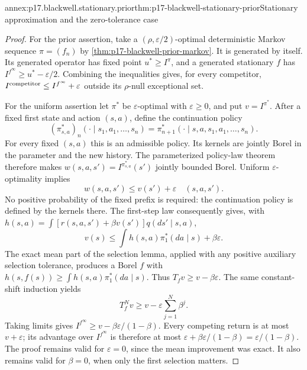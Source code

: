 \begin{annexitem}{annex:p17.blackwell.stationary.prior}{thm:p17-blackwell-stationary-prior}{Stationary approximation and the zero-tolerance case}
\begin{proof}
For the prior assertion, take a
\((\rho,\varepsilon/2)\)-optimal deterministic Markov
sequence \(\pi=(f_n)\) by
\cref{thm:p17-blackwell-prior-markov}.
It is generated by itself. Its generated operator has
fixed point \(u^*\geq I^\pi\), and a generated stationary
\(f\) has \(I^{f^\infty}\geq u^*-\varepsilon/2\).
Combining the inequalities gives, for every competitor,
\(I^{\rm competitor}\leq I^{f^\infty}+\varepsilon\)
outside its \(\rho\)-null exceptional set.

For the uniform assertion let \(\pi^*\) be
\(\varepsilon\)-optimal with \(\varepsilon\geq0\), and put
\(v=I^{\pi^*}\). After a fixed first state and action
\((s,a)\), define the continuation policy
\[
 (\pi^*_{s,a})_n(\cdot\mid s_1,a_1,\ldots,s_n)
   =\pi^*_{n+1}(\cdot\mid s,a,s_1,a_1,\ldots,s_n).
\]
For every fixed \((s,a)\) this is an admissible policy.
Its kernels are jointly Borel in the parameter and the
new history. The parameterized policy-law theorem therefore
makes \(w(s,a,s')=I^{\pi^*_{s,a}}(s')\) jointly bounded
Borel. Uniform \(\varepsilon\)-optimality implies
\[
                     w(s,a,s')\leq v(s')+\varepsilon
                                     \quad(s,a,s').
\]
No positive probability of the fixed prefix is required:
the continuation policy is defined by the kernels there.
The first-step law consequently gives, with
\(h(s,a)=\int[r(s,a,s')+\beta v(s')]q(ds'\mid s,a)\),
\[
            v(s)\leq\int h(s,a)\pi^*_1(da\mid s)
                                               +\beta\varepsilon.
\]
The exact mean part of the selection lemma, applied with
any positive auxiliary selection tolerance, produces a
Borel \(f\) with \(h(s,f(s))\geq\int h(s,a)\pi^*_1(da\mid s)\).
Thus \(T_fv\geq v-\beta\varepsilon\).
The same constant-shift induction yields
\[
          T_f^Nv\geq v-\varepsilon\sum_{j=1}^N\beta^j.
\]
Taking limits gives
\(I^{f^\infty}\geq v-\beta\varepsilon/(1-\beta)\).
Every competing return is at most \(v+\varepsilon\);
its advantage over \(I^{f^\infty}\) is therefore at most
\(\varepsilon+\beta\varepsilon/(1-\beta)
 =\varepsilon/(1-\beta)\).
The proof remains valid for \(\varepsilon=0\), since
the mean improvement was exact. It also remains valid
for \(\beta=0\), when only the first selection matters.
\end{proof}
\end{annexitem}

